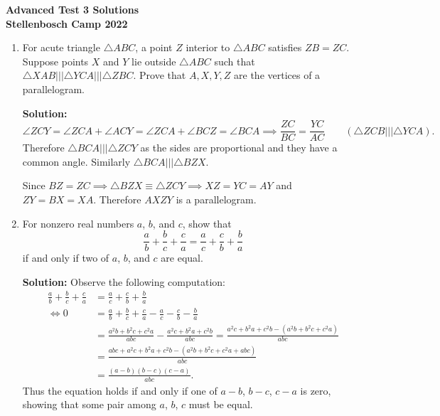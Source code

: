 \documentclass{article}
\begin{document}
\thispagestyle{empty}

\begin{center} \Large \bfseries
  Advanced Test 3 Solutions
  \\ \vspace{1em}
  Stellenbosch Camp 2022
\end{center}

\bigskip

\begin{enumerate}[itemsep=24pt]

\item 
For acute triangle $\triangle ABC$, a point $Z$ interior to $\triangle ABC$ satisfies $ZB = ZC$.
Suppose points $X$ and $Y$ lie outside $\triangle ABC$ such that $\triangle XAB \mathrel{|||} \triangle YCA \mathrel{|||} \triangle ZBC$.
Prove that $A,X,Y,Z$ are the vertices of a parallelogram. 

\textbf{Solution:}
$$\angle ZCY = \angle ZCA + \angle ACY = \angle ZCA + \angle BCZ = \angle BCA \implies \frac{ZC}{BC} = \frac{YC}{AC} \qquad (\triangle ZCB \mathrel{|||} \triangle YCA).$$
Therefore $\triangle BCA \mathrel{|||} \triangle ZCY$ as the sides are proportional and they have a common angle. Similarly $\triangle BCA \mathrel{|||} \triangle BZX$. 

Since $BZ = ZC \implies \triangle BZX \equiv \triangle ZCY \implies XZ = YC = AY$ and $ZY = BX = XA$.
Therefore $AXZY$ is a parallelogram.


\item %
For nonzero real numbers $a$, $b$, and $c$, show that
\[ \frac{a}{b} +\frac{b}{c} +\frac{c}{a} = \frac{a}{c} +\frac{c}{b} +\frac{b}{a} \]
if and only if two of $a$, $b$, and $c$ are equal.

\textbf{Solution:} Observe the following computation:
\begin{align*}
  \frac{a}{b} +\frac{b}{c} +\frac{c}{a} &= \frac{a}{c} +\frac{c}{b} +\frac{b}{a} \\
  \iff 0 &= \frac{a}{b} +\frac{b}{c} +\frac{c}{a} -\frac{a}{c} -\frac{c}{b} -\frac{b}{a} \\
  &= \frac{a^{2}b + b^{2}c + c^{2}a}{abc} -\frac{a^{2}c + b^{2}a + c^{2}b}{abc} = \frac{a^{2}c + b^{2}a + c^{2}b -(a^{2}b + b^{2}c + c^{2}a)}{abc} \\
  &= \frac{abc + a^{2}c + b^{2}a + c^{2}b - (a^{2}b + b^{2}c + c^{2}a+abc)}{abc} \\
  &= \frac{(a-b)(b-c)(c-a)}{abc}.
\end{align*}
Thus the equation holds if and only if one of $a-b$, $b-c$, $c-a$ is zero, showing that some pair among $a$, $b$, $c$ must be equal.



\end{enumerate}
\end{document}
